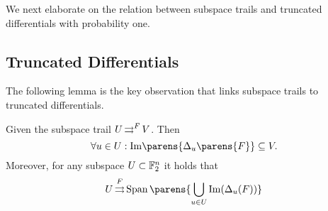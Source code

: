 We next elaborate on the relation between subspace trails and truncated differentials with probability one.

\subsection{Truncated Differentials}

The following lemma is the key observation that links subspace trails to truncated differentials.
 \begin{lemma}\label{st:lem:st_trunc_diff}
    Given the subspace trail $U \operatorname*{\rightrightarrows}^{F}_{} V$.
    Then
    \begin{equation*}
        \forall u \in U: \mathrm{Im}\parens{\Delta_{u}\parens{F}} \subseteq V.
    \end{equation*}
    Moreover, for any subspace $U \subset \mathbb{F}_2^n$ it holds that
    \begin{equation*}
        \propDiff{U}{F}{}{\SpanOp\parens{\bigcup_{u \in U} \mathrm{Im}(\Delta_u(F))}}
    \end{equation*}
\end{lemma}

